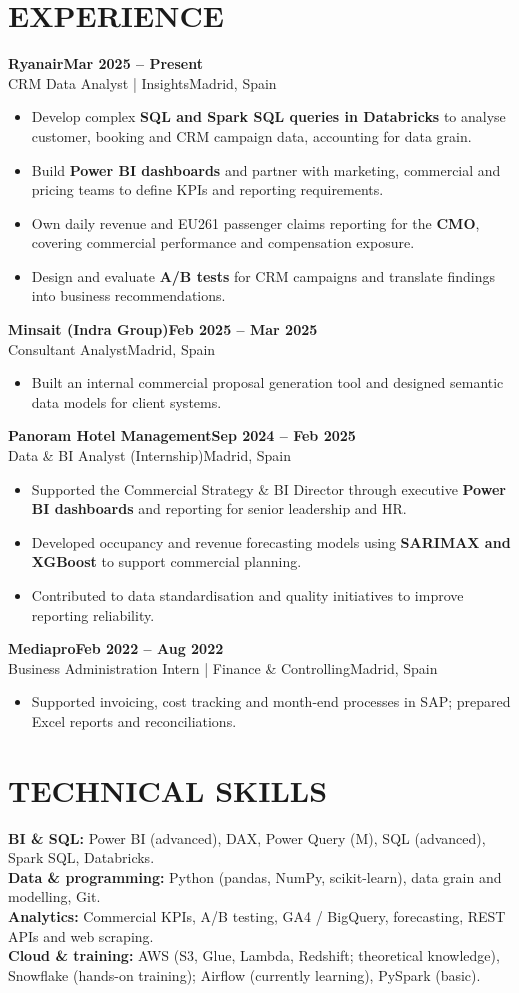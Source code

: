 \documentclass[a4paper,10pt]{article}
\newcommand{\job}[4]{\textbf{#1}\hfill\textbf{\small #2}\\{\small #3\hfill #4}\par}
\begin{document}
\section{EXPERIENCE}
\job{Ryanair}{Mar 2025 -- Present}{CRM Data Analyst | Insights}{Madrid, Spain}
\begin{itemize}
\item Develop complex \textbf{SQL and Spark SQL queries in Databricks} to analyse customer, booking and CRM campaign data, accounting for data grain.
\item Build \textbf{Power BI dashboards} and partner with marketing, commercial and pricing teams to define KPIs and reporting requirements.
\item Own daily revenue and EU261 passenger claims reporting for the \textbf{CMO}, covering commercial performance and compensation exposure.
\item Design and evaluate \textbf{A/B tests} for CRM campaigns and translate findings into business recommendations.
\end{itemize}
\job{Minsait (Indra Group)}{Feb 2025 -- Mar 2025}{Consultant Analyst}{Madrid, Spain}
\begin{itemize}
\item Built an internal commercial proposal generation tool and designed semantic data models for client systems.
\end{itemize}
\job{Panoram Hotel Management}{Sep 2024 -- Feb 2025}{Data \& BI Analyst (Internship)}{Madrid, Spain}
\begin{itemize}
\item Supported the Commercial Strategy \& BI Director through executive \textbf{Power BI dashboards} and reporting for senior leadership and HR.
\item Developed occupancy and revenue forecasting models using \textbf{SARIMAX and XGBoost} to support commercial planning.
\item Contributed to data standardisation and quality initiatives to improve reporting reliability.
\end{itemize}
\job{Mediapro}{Feb 2022 -- Aug 2022}{Business Administration Intern | Finance \& Controlling}{Madrid, Spain}
\begin{itemize}
\item Supported invoicing, cost tracking and month-end processes in SAP; prepared Excel reports and reconciliations.
\end{itemize}

\section{TECHNICAL SKILLS}
\textbf{BI \& SQL:} Power BI (advanced), DAX, Power Query (M), SQL (advanced), Spark SQL, Databricks.\\
\textbf{Data \& programming:} Python (pandas, NumPy, scikit-learn), data grain and modelling, Git.\\
\textbf{Analytics:} Commercial KPIs, A/B testing, GA4 / BigQuery, forecasting, REST APIs and web scraping.\\
\textbf{Cloud \& training:} AWS (S3, Glue, Lambda, Redshift; theoretical knowledge), Snowflake (hands-on training); Airflow (currently learning), PySpark (basic).
\end{document}
